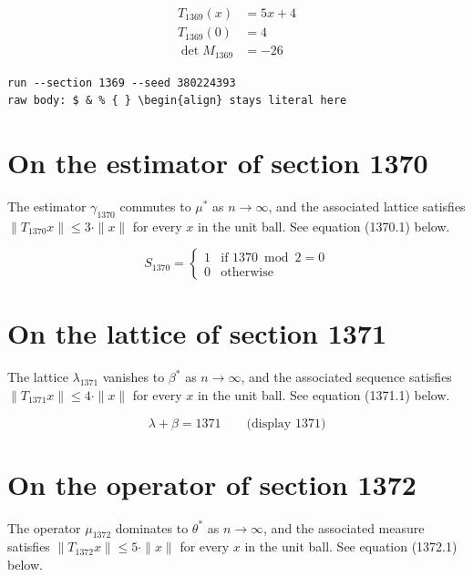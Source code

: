 \documentclass{article}
\begin{document}
\begin{align}
T_{1369}(x) &= 5 x + 4 \\
T_{1369}(0) &= 4 \\
\det M_{1369} &= -26
\end{align}

\begin{verbatim}
run --section 1369 --seed 380224393
raw body: $ & % { } \begin{align} stays literal here
\end{verbatim}

\section{On the estimator of section 1370}
The estimator $\gamma_{1370}$ commutes to $\mu^{*}$ as $n \to \infty$,
and the associated lattice satisfies $\|T_{1370} x\| \leq 3 \cdot \|x\|$
for every $x$ in the unit ball. See equation (1370.1) below.

\begin{equation}
S_{1370} = \begin{cases} 1 & \text{if } 1370 \bmod 2 = 0 \\ 0 & \text{otherwise} \end{cases}
\end{equation}

\section{On the lattice of section 1371}
The lattice $\lambda_{1371}$ vanishes to $\beta^{*}$ as $n \to \infty$,
and the associated sequence satisfies $\|T_{1371} x\| \leq 4 \cdot \|x\|$
for every $x$ in the unit ball. See equation (1371.1) below.

$$
\lambda + \beta = 1371 \qquad \text{(display 1371)}
$$

\section{On the operator of section 1372}
The operator $\mu_{1372}$ dominates to $\theta^{*}$ as $n \to \infty$,
and the associated measure satisfies $\|T_{1372} x\| \leq 5 \cdot \|x\|$
for every $x$ in the unit ball. See equation (1372.1) below.
\end{document}
